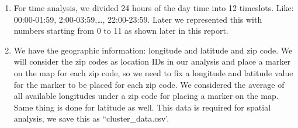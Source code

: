 \documentclass[
]{article}
\newenvironment{Shaded}{\begin{snugshade}}{\end{snugshade}}
\newcommand{\FunctionTok}[1]{\textcolor[rgb]{0.00,0.00,0.00}{#1}}
\newcommand{\NormalTok}[1]{#1}
\newcommand{\OtherTok}[1]{\textcolor[rgb]{0.56,0.35,0.01}{#1}}
\newcommand{\SpecialCharTok}[1]{\textcolor[rgb]{0.00,0.00,0.00}{#1}}
\begin{document}
\begin{enumerate}
\begin{Shaded}
\end{Shaded}
\item
  For time analysis, we divided 24 hours of the day time into 12
  timeslots. Like: 00:00-01:59, 2:00-03:59,\ldots, 22:00-23:59. Later we
  represented this with numbers starting from 0 to 11 as shown later in
  this report.
\item
  We have the geographic information: longitude and latitude and zip
  code. We will consider the zip codes as location IDs in our analysis
  and place a marker on the map for each zip code, so we need to fix a
  longitude and latitude value for the marker to be placed for each zip
  code. We considered the average of all available longitudes under a
  zip code for placing a marker on the map. Same thing is done for
  latitude as well. This data is required for spatial analysis, we save
  this as ``cluster\_data.csv'.


\end{enumerate}
\end{document}
